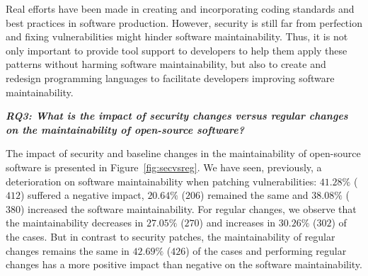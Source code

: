 \documentclass[10pt,conference]{IEEEtran}
\begin{document}
Real
efforts have been made in creating and incorporating coding standards and best
practices in software production. However, security is still far from perfection
and fixing vulnerabilities might hinder software maintainability. Thus, it is
not only important to provide tool support to developers to help them apply these
patterns without harming software maintainability, but also to create and redesign
programming languages to facilitate developers improving software maintainability.


%




\textit{\textbf{RQ3: What is the impact of security changes versus regular 
changes on the maintainability of open-source software?}}

The impact of security and baseline changes in the maintainability of
open-source software is presented in Figure~\ref{fig:secvsreg}.  
We have seen, previously, a deterioration on software maintainability 
when patching vulnerabilities: $41.28\%$ ($412$) suffered a 
negative impact, $20.64\%$ ($206$) remained the same and $38.08\%$ 
($380$) increased the software maintainability. For regular changes, 
we observe that the maintainability decreases in $27.05\%$ ($270$) 
and increases in $30.26\%$ ($302$) of the cases. But in contrast to 
security patches, the maintainability of regular changes remains the 
same in $42.69\%$ ($426$) of the cases and performing regular
changes has a more positive impact than negative on the software 
maintainability. 
\end{document}
